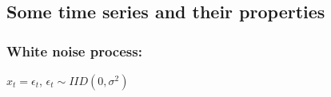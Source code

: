 \begin{enumerate}[(a)]
%
%
%
%
%
%
%
%
%
%
%
%

\end{enumerate}

%
%
%
%
%
%
%
%

\subsection{Some time series and their properties}


\subsubsection{White noise process:}  \(x_t = \epsilon_t\), \(\epsilon_t \sim IID(0, \sigma^2)\)

